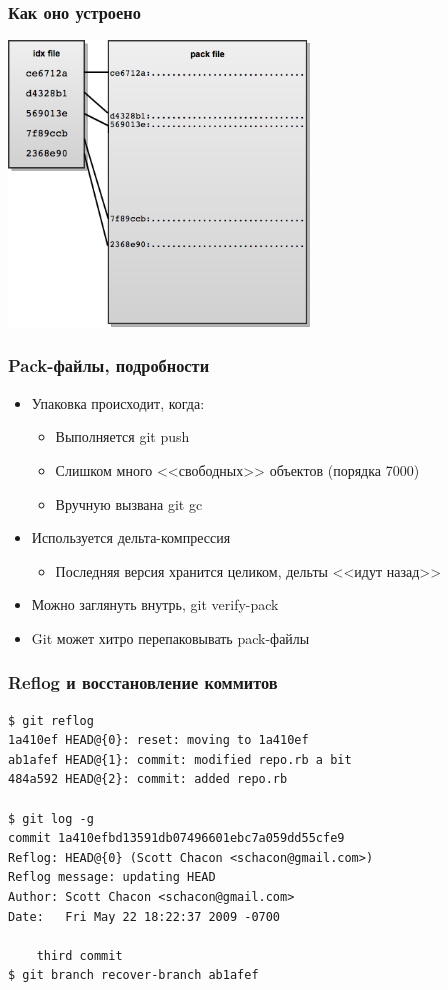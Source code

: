 \documentclass[xetex,mathserif,serif]{beamer}
\begin{document}
    \begin{frame}
        \frametitle{Как оно устроено}
        \begin{center}
            \includegraphics[width=0.6\textwidth]{gitPackFiles.png}
        \end{center}
    \end{frame}

    \begin{frame}
        \frametitle{Pack-файлы, подробности}
        \begin{itemize}
            \item Упаковка происходит, когда:
            \begin{itemize}
                \item Выполняется git push
                \item Слишком много <<свободных>> объектов (порядка 7000)
                \item Вручную вызвана git gc
            \end{itemize}
            \item Используется дельта-компрессия
            \begin{itemize}
                \item Последняя версия хранится целиком, дельты <<идут назад>>
            \end{itemize}
            \item Можно заглянуть внутрь, git verify-pack
            \item Git может хитро перепаковывать pack-файлы
        \end{itemize}
    \end{frame}

    \begin{frame}[fragile]
        \frametitle{Reflog и восстановление коммитов}
            \begin{verbatim}
$ git reflog
1a410ef HEAD@{0}: reset: moving to 1a410ef
ab1afef HEAD@{1}: commit: modified repo.rb a bit
484a592 HEAD@{2}: commit: added repo.rb

$ git log -g
commit 1a410efbd13591db07496601ebc7a059dd55cfe9
Reflog: HEAD@{0} (Scott Chacon <schacon@gmail.com>)
Reflog message: updating HEAD
Author: Scott Chacon <schacon@gmail.com>
Date:   Fri May 22 18:22:37 2009 -0700

    third commit
$ git branch recover-branch ab1afef
            \end{verbatim}
    \end{frame}
\end{document}
